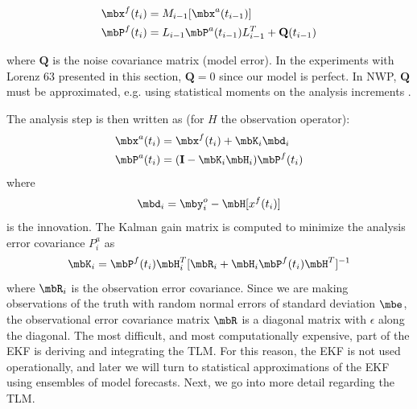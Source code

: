 \begin{align*} \mbx^f (t_i) &= M _{i-1} [\mbx ^a (t_{i-1} ) ]\\
\mbP^f (t_i ) &= L_{i-1} \mbP^a (t_{i-1} ) L^T _{i-1} + \mathbf{Q} (t_{i-1} ) \end{align*}

where $\mathbf{Q}$ is the noise covariance matrix (model error).
In the experiments with Lorenz 63 presented in this section, $\mathbf{Q} = 0$ since our model is perfect.
In NWP, $\mathbf{Q}$ must be approximated, e.g. using statistical moments on the analysis increments \cite{danforth2007estimating,li2009accounting}.

The analysis step is then written as (for $H$ the observation operator):
\begin{align} \mbx^a (t_i ) &= \mbx^f (t_i) + \mbK_i \mbd_i\\
\mbP^a (t_i) &= (\mathbf{I} - \mbK_i \mbH_i )\mbP^f (t_i) \end{align}
where
\[ \mbd_i = \mby_i^o - \mbH[x^f (t_i) ] \]
is the innovation. The Kalman gain matrix is computed to minimize the analysis error covariance $P^a _i$ as
\[ \mbK_i = \mbP^f (t_i) \mbH_i ^T [ \mbR_i + \mbH_i \mbP^f (t_i) \mbH^T ] ^{-1} \]
where $\mbR_i$ is the observation error covariance.
Since we are making observations of the truth with random normal errors of standard deviation $\mbe$, the observational error covariance matrix $\mbR$ is a diagonal matrix with $\epsilon$ along the diagonal.
The most difficult, and most computationally expensive, part of the EKF is deriving and integrating the TLM.
For this reason, the EKF is not used operationally, and later we will turn to statistical approximations of the EKF using ensembles of model forecasts.
Next, we go into more detail regarding the TLM.


